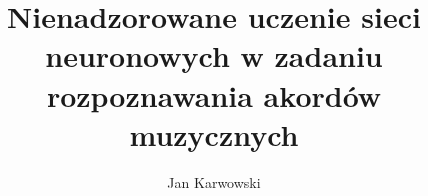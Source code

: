 \documentclass[12pt,twoside]{report}
\author{Jan Karwowski}
\title{Nienadzorowane uczenie sieci neuronowych w zadaniu rozpoznawania akordów muzycznych}
\begin{document}

\null\newpage

\tableofcontents








\printbibliography

\listoffigures
\listoftables
\end{document}
